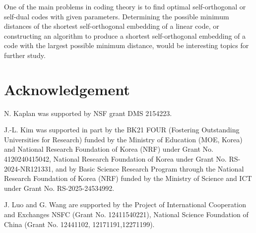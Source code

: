 \documentclass{article}
\theoremstyle{definition}
\theoremstyle{remark}
\begin{document}
One of the main problems in coding theory is to find optimal self-orthogonal or self-dual codes with given parameters. Determining the possible minimum distances of the shortest self-orthogonal embedding of a linear code, or constructing an algorithm to produce a shortest self-orthogonal embedding of a code with the largest possible minimum distance, would be interesting topics for further study.

\section*{Acknowledgement}
N. Kaplan was supported by NSF grant DMS 2154223.

J.-L. Kim was supported in part by the BK21 FOUR (Fostering Outstanding Universities for Research) funded by the Ministry of
Education (MOE, Korea) and National Research Foundation of Korea (NRF)
under Grant No. 4120240415042, National Research Foundation of Korea under Grant No. RS-2024-NR121331, and by Basic Science Research Program through the National Research Foundation of Korea (NRF) funded by the Ministry of Science and ICT under Grant No. RS-2025-24534992.

J. Luo and G. Wang are supported by the Project of International Cooperation and Exchanges NSFC (Grant No. 12411540221), National Science Foundation of China (Grant No. 12441102, 12171191,12271199).
\end{document}
